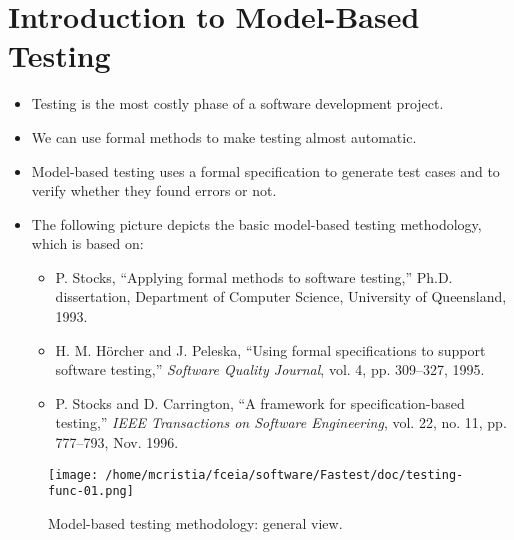 \section{Introduction to Model-Based Testing}

\begin{itemize}

\item Testing is the most costly phase of a software development project.

\item We can use formal methods to make testing almost automatic.

\item Model-based testing uses a formal specification to generate test cases and to verify whether they found errors or not.

\item The following picture depicts the basic model-based testing methodology, which is based on:

\begin{itemize}
\item P. Stocks, ``Applying formal methods to software testing,'' Ph.D. dissertation, Department of Computer Science, University of Queensland, 1993.

\item H. M. Hörcher and J. Peleska, ``Using formal specifications to support software testing,'' {\it Software Quality Journal}, vol. 4, pp. 309--327, 1995.

\item P. Stocks and D. Carrington, ``A framework for specification-based testing,'' {\it IEEE Transactions on Software Engineering}, vol. 22, no. 11, pp. 777--793, Nov. 1996.
\end{itemize}

\end{itemize}

\begin{figure}[h]
\begin{center}
\texttt{[image: /home/mcristia/fceia/software/Fastest/doc/testing-func-01.png]} 
\caption{Model-based testing methodology: general view.}
\end{center}
\end{figure}


